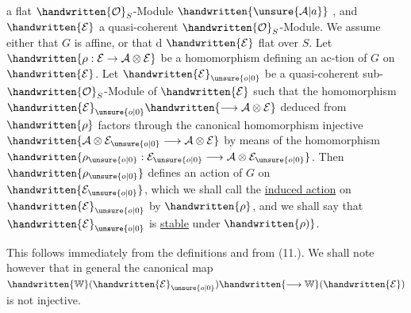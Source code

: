 a flat $\handwritten{\mathcal{O}}_S$-Module $\handwritten{\unsure{\mathcal{A}|a}}$ , and $\handwritten{\mathcal{E}}$ a quasi-coherent $\handwritten{\mathcal{O}}_S$-Module. We assume either that $G$ is affine, or that d $\handwritten{\mathcal{E}}$  flat over $S$. Let $\handwritten{\rho:\mathcal{E}\to\mathcal{A}\otimes\mathcal{E}}$ be a homomorphism defining an ac-\linebreak tion of $G$ on $\handwritten{\mathcal{E}}$. Let $\handwritten{\mathcal{E}}_{\unsure{o|0}}$ be a quasi-coherent sub-$\handwritten{\mathcal{O}}_S$-Module of $\handwritten{\mathcal{E}}$ such that the homomorphism $\handwritten{\mathcal{E}}_{\unsure{o|0}}\handwritten{\longrightarrow\mathcal{A}\otimes\mathcal{E}}$ deduced from $\handwritten{\rho}$ factors through the canonical homomorphism \handwritten{(}injective $\handwritten{\mathcal{A}\otimes\mathcal{E}_{\unsure{o|0}}\longrightarrow\mathcal{A}\otimes\mathcal{E}}$ by means of the homomorphism $\handwritten{\rho_{\unsure{o|0}}:\mathcal{E}_{\unsure{o|0}}\longrightarrow\mathcal{A}\otimes\mathcal{E}_{\unsure{o|0}}}$. Then $\handwritten{\rho_{\unsure{o|0}}}$ defines an action of $G$ on $\handwritten{\mathcal{E}_{\unsure{o|0}}}$\handwritten{(},\handwritten{(} which we shall call the \uline{induced action} on $\handwritten{\mathcal{E}}_{\unsure{o|0}}$ by $\handwritten{\rho}$, and we shall say that $\handwritten{\mathcal{E}}_{\unsure{o|0}}$ is \uline{stable} under $\handwritten{\rho)}$.

This follows immediately from the definitions and from (11.). We shall note however that in general the canonical map $\handwritten{\mathbb{W}}(\handwritten{\mathcal{E}}_{\unsure{o|0}})\handwritten{\longrightarrow\mathbb{W}}(\handwritten{\mathcal{E}})$ is not injective.

